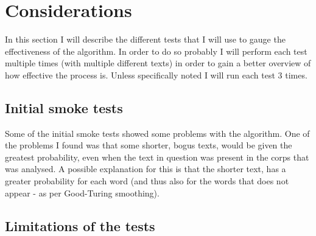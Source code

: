 \section{Considerations}
\label{considerations}

In this section I will describe the different tests that I will use to gauge the effectiveness of the algorithm. In order to do so probably I will perform each test multiple times (with multiple different texts) in order to gain a better overview of how effective the process is. Unless specifically noted I will run each test 3 times. 

\subsection{Initial smoke tests}
\label{smokeTest}
Some of the initial smoke tests showed some problems with the algorithm. 
One of the problems I found was that some shorter, bogus texts, would be given the greatest probability, even when the text in question was present in the corps that was analysed. A possible explanation for this is that the shorter text, has a greater probability for each word (and thus also for the  words that does not appear - as per Good-Turing smoothing).

\subsection{Limitations of the tests}





